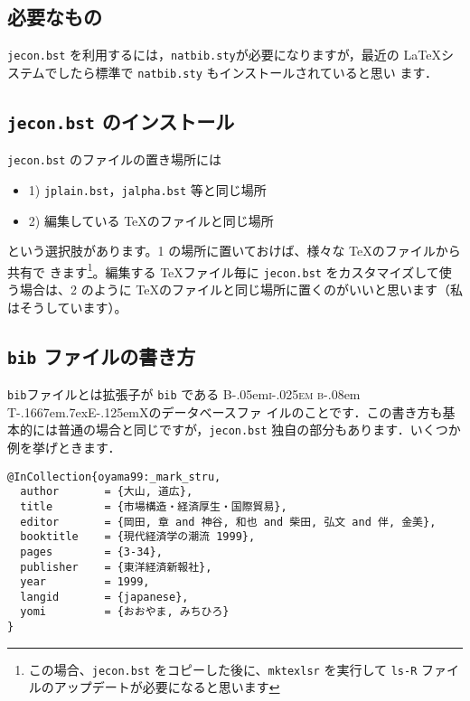 \documentclass[article]{jlreq}
\newcommand{\BibTeX}{\textrm{B\kern-.05em\textsc{i\kern-.025em b}\kern-.08em%
T\kern-.1667em\lower.7ex\hbox{E}\kern-.125emX}}
\begin{document}
\subsection{必要なもの}

\texttt{jecon.bst} を利用するには，\texttt{natbib.sty}が必要になりますが，最近の
\LaTeX システムでしたら標準で \texttt{natbib.sty} もインストールされていると思い
ます．


\subsection{\texttt{jecon.bst} のインストール}

\texttt{jecon.bst} のファイルの置き場所には
\begin{itemize}
 \item 1) \texttt{jplain.bst}，\texttt{jalpha.bst} 等と同じ場所
 \item 2) 編集している \TeX のファイルと同じ場所
\end{itemize}
という選択肢があります。1 の場所に置いておけば、様々な \TeX のファイルから共有で
きます\footnote{この場合、\texttt{jecon.bst} をコピーした後に、\texttt{mktexlsr}
を実行して \texttt{ls-R} ファイルのアップデートが必要になると思います}。編集する
\TeX ファイル毎に \texttt{jecon.bst} をカスタマイズして使う場合は、2 のように
\TeX のファイルと同じ場所に置くのがいいと思います（私はそうしています）。

\subsection{\texttt{bib} ファイルの書き方}

\texttt{bib}ファイルとは拡張子が \texttt{bib} である \BibTeX のデータベースファ
イルのことです．この書き方も基本的には普通の場合と同じですが，\texttt{jecon.bst}
独自の部分もあります．いくつか例を挙げときます．

\begin{screen}
 \begin{verbatim}
@InCollection{oyama99:_mark_stru,
  author       = {大山, 道広},
  title        = {市場構造・経済厚生・国際貿易},
  editor       = {岡田, 章 and 神谷, 和也 and 柴田, 弘文 and 伴, 金美},
  booktitle    = {現代経済学の潮流 1999},
  pages        = {3-34},
  publisher    = {東洋経済新報社},
  year         = 1999,
  langid       = {japanese},
  yomi         = {おおやま, みちひろ}
}
\end{verbatim}
\end{screen}
\end{document}
